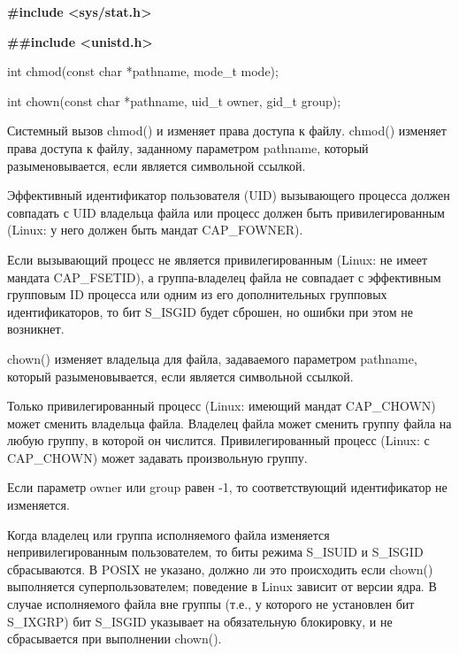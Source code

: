 \begin{center}
    \item \textbf{\#include <sys/stat.h>}
    \item \textbf{\##include <unistd.h>}
\end{center}

\begin{center}
    \item int chmod(const char *pathname, mode\_t mode); 
    \item int chown(const char *pathname, uid\_t owner, gid\_t group);
\end{center}

\par Системный вызов chmod() и  изменяет права доступа к файлу.
chmod() изменяет права доступа к файлу, заданному параметром pathname, который разыменовывается, если является символьной ссылкой. \\

\par Эффективный идентификатор пользователя (UID) вызывающего процесса должен совпадать с UID владельца файла или процесс должен быть привилегированным (Linux: у него должен быть мандат CAP\_FOWNER).

Если вызывающий процесс не является привилегированным (Linux: не имеет мандата CAP\_FSETID), а группа-владелец файла не совпадает с эффективным групповым ID процесса или одним из его дополнительных групповых идентификаторов, то бит S\_ISGID будет сброшен, но ошибки при этом не возникнет. \\


\par chown() изменяет владельца для файла, задаваемого параметром pathname, который разыменовывается, если является символьной ссылкой. \\

\par Только привилегированный процесс (Linux: имеющий мандат CAP\_CHOWN) может сменить владельца файла. Владелец файла может сменить группу файла на любую группу, в которой он числится. Привилегированный процесс (Linux: с CAP\_CHOWN) может задавать произвольную группу.

Если параметр owner или group равен -1, то соответствующий идентификатор не изменяется.

Когда владелец или группа исполняемого файла изменяется непривилегированным пользователем, то биты режима S\_ISUID и S\_ISGID сбрасываются. В POSIX не указано, должно ли это происходить если chown() выполняется суперпользователем; поведение в Linux зависит от версии ядра. В случае исполняемого файла вне группы (т.е., у которого не установлен бит S\_IXGRP) бит S\_ISGID указывает на обязательную блокировку, и не сбрасывается при выполнении chown().

